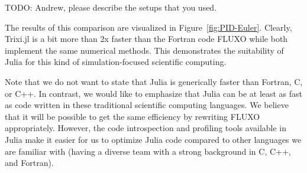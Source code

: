 \documentclass{juliacon}
\begin{document}
TODO: Andrew, please describe the setups that you used.

The results of this comparison are visualized in Figure~\ref{fig:PID-Euler}.
Clearly, Trixi.jl is a bit more than 2x faster than the Fortran code FLUXO
while both implement the same numerical methods. This demonstrates the
suitability of Julia for this kind of simulation-focused scientific computing.

Note that we do not want to state that Julia is generically faster than Fortran,
C, or C++. In contrast, we would like to emphasize that Julia can be at least
as fast as code written in these traditional scientific computing languages.
We believe that it will be possible to get the same efficiency by rewriting
FLUXO appropriately. However, the code introspection and profiling tools available
in Julia make it easier for us to optimize Julia code compared to other languages
we are familiar with (having a diverse team with a strong background in C, C++,
and Fortran).
\end{document}
